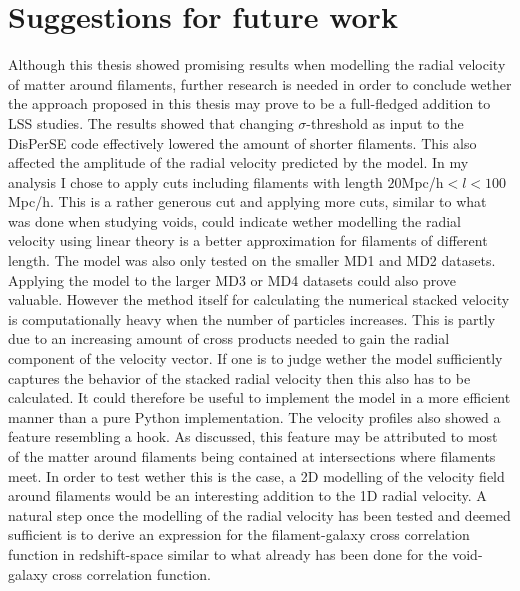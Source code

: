 \section{Suggestions for future work}\label{sec:futurework}
Although this thesis showed promising results when modelling the radial velocity of matter around filaments, further research is needed in order to conclude wether the approach proposed in this thesis may prove to be a full-fledged addition to LSS studies. The results showed that changing $\sigma$-threshold as input to the DisPerSE code effectively lowered the amount of shorter filaments. This also affected the amplitude of the radial velocity predicted by the model. In my analysis I chose to apply cuts including filaments with length $20$Mpc/h$<l<100$Mpc/h. This is a rather generous cut and applying more cuts, similar to what was done when studying voids, could indicate wether modelling the radial velocity using linear theory is a better approximation for filaments of different length. The model was also only tested on the smaller MD1 and MD2 datasets. Applying the model to the larger MD3 or MD4 datasets could also prove valuable. However the method itself for calculating the numerical stacked velocity is computationally heavy when the number of particles increases. This is partly due to an increasing amount of cross products needed to gain the radial component of the velocity vector. If one is to judge wether the model sufficiently captures the behavior of the stacked radial velocity then this also has to be calculated. It could therefore be useful to implement the model in a more efficient manner than a pure Python implementation. The velocity profiles also showed a feature resembling a hook. As discussed, this feature may be attributed to most of the matter around filaments being contained at intersections where filaments meet. In order to test wether this is the case, a 2D modelling of the velocity field around filaments would be an interesting addition to the 1D radial velocity. A natural step once the modelling of the radial velocity has been tested and deemed sufficient is to derive an expression for the filament-galaxy cross correlation function in redshift-space similar to what already has been done for the void-galaxy cross correlation function.\\\indent
